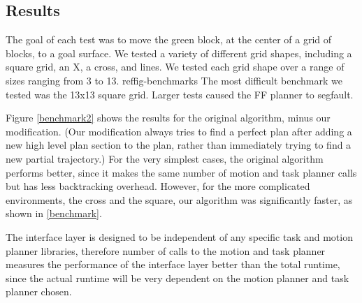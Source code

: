 \documentclass[12pt]{article}
\begin{document}
\subsection{Results}
The goal of each test was to move the green block, at the center of a grid of blocks, to a goal surface. 
We tested a variety of different grid shapes, including a square grid, an X, a cross, and lines. 
We tested each grid shape over a range of sizes ranging from 3 to 13. ref{fig-benchmarks} 
The most difficult benchmark we tested was the 13x13 square grid. Larger tests caused the FF planner to segfault.

Figure \ref{benchmark2} shows the results for the original algorithm, minus our modification.  (Our modification always tries to find a perfect plan after adding a new high level plan section to the plan, rather than immediately trying to find a new partial trajectory.)  For the very simplest cases, the original algorithm performs better, since it makes the same number of motion and task planner calls but has less backtracking overhead.  However, for the more complicated environments, the cross and the square, our algorithm was significantly faster, as shown in \ref{benchmark}.

The interface layer is designed to be independent of any specific task and motion planner libraries, therefore number of calls to the motion and task planner measures the performance of the interface layer better than the total runtime, since the actual runtime will be very dependent on the motion planner and task planner chosen.
\end{document}
